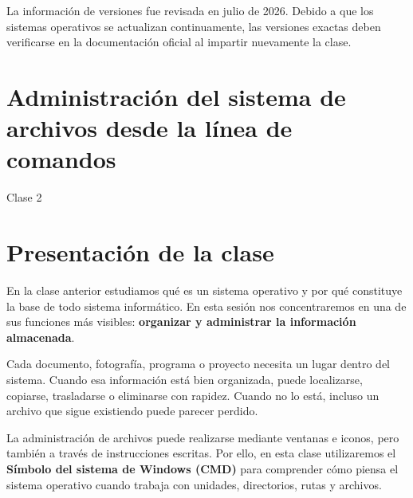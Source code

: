 \documentclass[
  spanish,
  letterpaper,
]{scrbook}
\begin{document}
\begin{tcolorbox}[enhanced jigsaw, arc=.35mm, bottomrule=.15mm, bottomtitle=1mm, breakable, colback=white, colbacktitle=quarto-callout-note-color!10!white, colframe=quarto-callout-note-color-frame, coltitle=black, left=2mm, leftrule=.75mm, opacityback=0, opacitybacktitle=0.6, rightrule=.15mm, title=\textcolor{quarto-callout-note-color}{\faInfo}\hspace{0.5em}{Nota editorial}, titlerule=0mm, toprule=.15mm, toptitle=1mm]

La información de versiones fue revisada en julio de 2026. Debido a que
los sistemas operativos se actualizan continuamente, las versiones
exactas deben verificarse en la documentación oficial al impartir
nuevamente la clase.

\end{tcolorbox}


\chapter{Administración del sistema de archivos desde la línea de
comandos}\label{administraciuxf3n-del-sistema-de-archivos-desde-la-luxednea-de-comandos}

Clase 2

\hfill\break


\chapter{Presentación de la clase}\label{presentaciuxf3n-de-la-clase-1}

En la clase anterior estudiamos qué es un sistema operativo y por qué
constituye la base de todo sistema informático. En esta sesión nos
concentraremos en una de sus funciones más visibles: \textbf{organizar y
administrar la información almacenada}.

Cada documento, fotografía, programa o proyecto necesita un lugar dentro
del sistema. Cuando esa información está bien organizada, puede
localizarse, copiarse, trasladarse o eliminarse con rapidez. Cuando no
lo está, incluso un archivo que sigue existiendo puede parecer perdido.

La administración de archivos puede realizarse mediante ventanas e
iconos, pero también a través de instrucciones escritas. Por ello, en
esta clase utilizaremos el \textbf{Símbolo del sistema de Windows (CMD)}
para comprender cómo piensa el sistema operativo cuando trabaja con
unidades, directorios, rutas y archivos.
\end{document}
